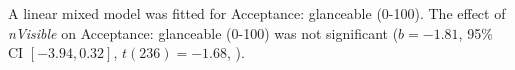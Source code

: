 A linear mixed model was fitted for Acceptance: glanceable (0-100).
The effect of \textit{nVisible} on Acceptance: glanceable (0-100) was not significant ($b = -1.81$, 95\% CI $[-3.94, 0.32]$, $t(236) = -1.68$, ).
